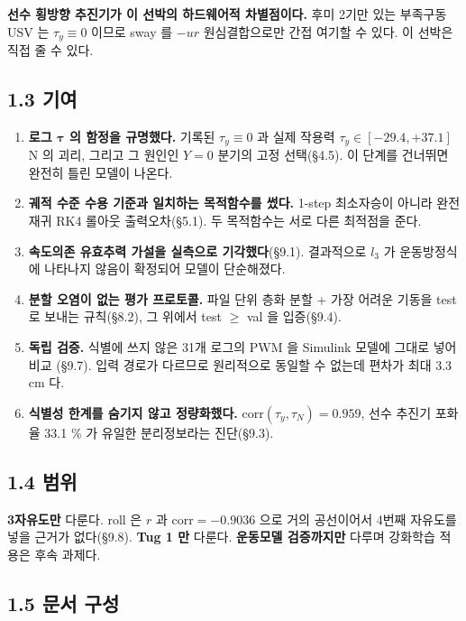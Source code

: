 \documentclass[10pt,a4paper]{article}
\begin{document}
\textbf{선수 횡방향 추진기가 이 선박의 하드웨어적 차별점이다.} 후미 2기만 있는 부족구동 USV 는 $\tau_y \equiv 0$ 이므로 sway 를 $-ur$ 원심결합으로만 간접 여기할 수 있다. 이 선박은 직접 줄 수 있다.

\subsection*{1.3 기여}

\begin{enumerate}[leftmargin=1.5em,itemsep=2pt,parsep=2pt,topsep=3pt]
\item \textbf{로그 $\boldsymbol{\tau}$ 의 함정을 규명했다.} 기록된 $\tau_y \equiv 0$ 과 실제 작용력 $\tau_y \in [-29.4, +37.1]$ N 의 괴리, 그리고 그 원인인 $Y=0$ 분기의 고정 선택(\S{}4.5). 이 단계를 건너뛰면 완전히 틀린 모델이 나온다.
\item \textbf{궤적 수준 수용 기준과 일치하는 목적함수를 썼다.} 1-step 최소자승이 아니라 완전재귀 RK4 롤아웃 출력오차(\S{}5.1). 두 목적함수는 서로 다른 최적점을 준다.
\item \textbf{속도의존 유효추력 가설을 실측으로 기각했다}(\S{}9.1). 결과적으로 $l_3$ 가 운동방정식에 나타나지 않음이 확정되어 모델이 단순해졌다.
\item \textbf{분할 오염이 없는 평가 프로토콜.} 파일 단위 층화 분할 + 가장 어려운 기동을 test 로 보내는 규칙(\S{}8.2), 그 위에서 test $\geq$ val 을 입증(\S{}9.4).
\item \textbf{독립 검증.} 식별에 쓰지 않은 31개 로그의 PWM 을 Simulink 모델에 그대로 넣어 비교 (\S{}9.7). 입력 경로가 다르므로 원리적으로 동일할 수 없는데 편차가 최대 3.3 cm 다.
\item \textbf{식별성 한계를 숨기지 않고 정량화했다.} $\mathrm{corr}(\tau_y,\tau_N) = 0.959$, 선수 추진기 포화율 33.1 \% 가 유일한 분리정보라는 진단(\S{}9.3).
\end{enumerate}

\subsection*{1.4 범위}

\textbf{3자유도만} 다룬다. roll 은 $r$ 과 $\mathrm{corr} = -0.9036$ 으로 거의 공선이어서 4번째 자유도를 넣을 근거가 없다(\S{}9.8). \textbf{Tug 1 만} 다룬다. \textbf{운동모델 검증까지만} 다루며 강화학습 적용은 후속 과제다.

\subsection*{1.5 문서 구성}
\end{document}
